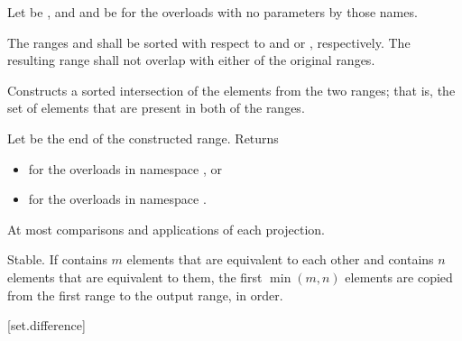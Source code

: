\begin{itemdescr}
\pnum
Let  be ,
and  and  be 
for the overloads with no parameters by those names.

\pnum
\requires
The ranges  and  shall be sorted
with respect to  and  or , respectively.
The resulting range shall not overlap with either of the original ranges.

\pnum
\effects
Constructs a sorted intersection of the elements from the two ranges;
that is, the set of elements that are present in both of the ranges.

\pnum
\returns
Let  be the end of the constructed range.
Returns
\begin{itemize}
\item
  for the overloads in namespace , or
\item
  for the overloads in namespace .
\end{itemize}

\pnum
\complexity
At most 
comparisons and applications of each projection.

\pnum
\remarks
Stable.
If  contains $m$ elements
that are equivalent to each other and
 contains $n$ elements
that are equivalent to them,
the first $\min(m, n)$ elements
are copied from the first range to the output range, in order.
\end{itemdescr}

[set.difference]{}

